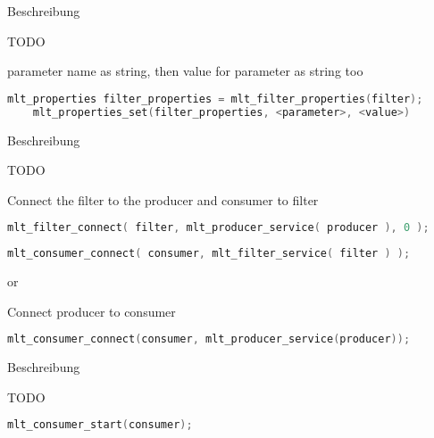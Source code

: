 \documentclass[../MasterThesis.tex]{subfiles}
\begin{document}
\begin{description}[font=\normalfont\color{RedViolet!80!black}, style=nextline]
	\item[Create a filter properties] Beschreibung
	
	TODO
	
	parameter name as string, then value for parameter as string too

	\begin{lstlisting}[language=C, numbers=none, basicstyle=\scriptsize\ttfamily, belowskip=0pt, aboveskip=9pt]
	mlt_properties filter_properties = mlt_filter_properties(filter);
	mlt_properties_set(filter_properties, <parameter>, <value>) \end{lstlisting}
	
	
	
	
	\item[Connect elements] Beschreibung
	
	TODO
	
	Connect the filter to the producer and consumer to filter
	
	\begin{lstlisting}[language=C, numbers=none, basicstyle=\scriptsize\ttfamily, belowskip=0pt, aboveskip=9pt]
	mlt_filter_connect( filter, mlt_producer_service( producer ), 0 ); \end{lstlisting}
	
	\begin{lstlisting}[language=C, numbers=none, basicstyle=\scriptsize\ttfamily, belowskip=0pt, aboveskip=9pt]
	mlt_consumer_connect( consumer, mlt_filter_service( filter ) ); \end{lstlisting}
	
	
	or 
	
	Connect producer to consumer
	
	\begin{lstlisting}[language=C, numbers=none, basicstyle=\scriptsize\ttfamily, belowskip=0pt, aboveskip=9pt]
	mlt_consumer_connect(consumer, mlt_producer_service(producer)); \end{lstlisting}
	
	
	
	\item[Start consumer] Beschreibung
	
	TODO
	
	\begin{lstlisting}[language=C, numbers=none, basicstyle=\scriptsize\ttfamily, belowskip=0pt, aboveskip=9pt]
	mlt_consumer_start(consumer);	\end{lstlisting}
	

\end{description}
\end{document}
